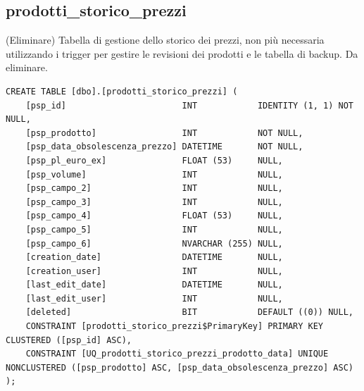 \documentclass[12pt]{article}
\begin{document}
\subsection{prodotti\_storico\_prezzi} (Eliminare)
Tabella di gestione dello storico dei prezzi,
non più necessaria utilizzando i trigger per gestire le revisioni dei prodotti e le tabella di backup.
Da eliminare.
\begin{lstlisting}
CREATE TABLE [dbo].[prodotti_storico_prezzi] (
    [psp_id]                       INT            IDENTITY (1, 1) NOT NULL,
    [psp_prodotto]                 INT            NOT NULL,
    [psp_data_obsolescenza_prezzo] DATETIME       NOT NULL,
    [psp_pl_euro_ex]               FLOAT (53)     NULL,
    [psp_volume]                   INT            NULL,
    [psp_campo_2]                  INT            NULL,
    [psp_campo_3]                  INT            NULL,
    [psp_campo_4]                  FLOAT (53)     NULL,
    [psp_campo_5]                  INT            NULL,
    [psp_campo_6]                  NVARCHAR (255) NULL,
    [creation_date]                DATETIME       NULL,
    [creation_user]                INT            NULL,
    [last_edit_date]               DATETIME       NULL,
    [last_edit_user]               INT            NULL,
    [deleted]                      BIT            DEFAULT ((0)) NULL,
    CONSTRAINT [prodotti_storico_prezzi$PrimaryKey] PRIMARY KEY CLUSTERED ([psp_id] ASC),
    CONSTRAINT [UQ_prodotti_storico_prezzi_prodotto_data] UNIQUE NONCLUSTERED ([psp_prodotto] ASC, [psp_data_obsolescenza_prezzo] ASC)
);
\end{lstlisting}
\end{document}
